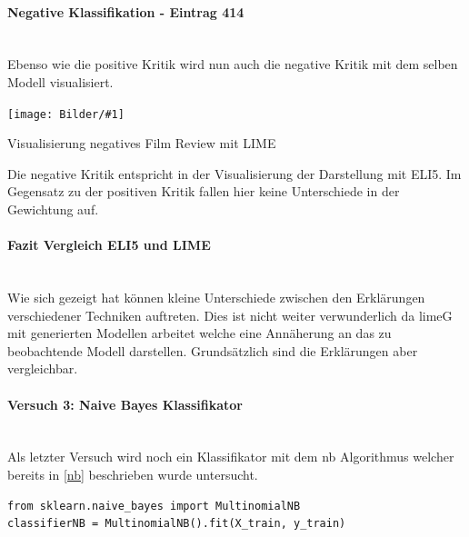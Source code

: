 \documentclass[
  12pt, %
  a4paper, %
  oneside, %
  openany, 
  numbers=noenddot, %
  BCOR=5mm, %
  parskip=half*, %
  thesis, %
]{bfhbook}
\newcommand{\parag}[1]{\paragraph*{#1}\mbox{}\\}
\newcommand{\imgText}[3]{
\begin{center}
    \begin{minipage}[t]{0.6\textwidth}
    		\vspace{0pt}
		\texttt{[image: Bilder/\#1]}
		\caption{#2}
	\end{minipage}\hfill
    \begin{minipage}[t]{0.4\textwidth}
    		\vspace{5pt}
  		#3
    \end{minipage}
\end{center}
}
\begin{document}
\parag{Negative Klassifikation - Eintrag 414}
Ebenso wie die positive Kritik wird nun auch die negative Kritik mit dem selben Modell visualisiert.
\imgText{MovieReview-RandomForest-Display-414.PNG}{Visualisierung negatives Film Review mit LIME}{
Die negative Kritik entspricht in der Visualisierung der Darstellung mit ELI5. Im Gegensatz zu der positiven Kritik fallen hier keine Unterschiede in der Gewichtung auf.
}

\parag{Fazit Vergleich ELI5 und LIME}
Wie sich gezeigt hat können kleine Unterschiede zwischen den Erklärungen verschiedener Techniken auftreten. Dies ist nicht weiter verwunderlich da \Gls{limeG} mit generierten Modellen arbeitet welche eine Annäherung an das zu beobachtende Modell darstellen. Grundsätzlich sind die Erklärungen aber vergleichbar.

\parag{Versuch 3: Naive Bayes Klassifikator}
Als letzter Versuch wird noch ein Klassifikator mit dem \Gls{nb} Algorithmus welcher bereits in \ref{nb} beschrieben wurde untersucht.
\begin{lstlisting}
from sklearn.naive_bayes import MultinomialNB
classifierNB = MultinomialNB().fit(X_train, y_train)
\end{lstlisting}
\end{document}
